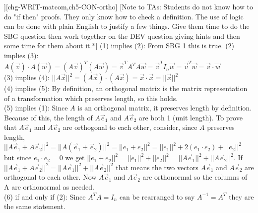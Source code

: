\begin{SaveQuestion}
{\begin{itemize}
\end{itemize}}
][chg-WRIT-matcom,ch5-CON-ortho] %
    [Note to TAs: Students do not know how to do "if then" proofs. They only know how to check a definition. The use of logic can be done with plain English to justify a few things. Give them time to do the SBG question then work together on the DEV question giving hints and then some time for them about it.*]    %
    (1) implies (2):
From SBG 1 this is true. 
(2) implies (3):
$A(\vec v) \cdot A(\vec w) = (A\vec v)^T(A\vec w) = \vec v ^T A^T A \vec w = \vec v ^T I_n \vec w = \vec v ^T \vec w = \vec v \cdot \vec w$ \\
(3) implies (4): $||A \vec x||^2 = (A\vec x) \cdot (A \vec x) = \vec x \cdot \vec x = ||\vec x||^2$ \\
(4) implies (5): By definition, an orthogonal matrix is the matrix representation of a transformation which preserves length, so this holds. \\
(5) implies (1): Since $A$ is an orthogonal matrix, it preserves length by definition. Because of this, the length of $A \vec e_1$ and $A \vec e_2$ are both 1 (unit length). To prove that $A \vec e_1$ and $A \vec e_2$ are orthogonal to each other, consider, since $A$ preserves length, 
$||A \vec e_1 + A\vec e_2||^2 = ||A(\vec e_1 + \vec e_2)||^2 = ||e_1 + e_2||^2 = ||e_1||^2 + 2(e_1 \cdot e_2) + ||e_2||^2$ but since $e_1 \cdot e_2 = 0$ we get $||e_1 + e_2||^2 = ||e_1||^2 + ||e_2||^2 = ||A \vec e_1||^2 + ||A \vec e_2||^2$. If $||A \vec e_1 + A \vec e_2||^2 = ||A \vec e_1||^2 + ||A \vec e_2||^2$ that means the two vectors $A \vec e_1$ and $A \vec e_2$ are orthogonal to each other. Now $A \vec e_1$ and $A \vec e_2$ are orthonormal so the columns of A are orthonormal as needed. \\
(6) if and only if (2): Since $A^TA=I_n$ can be rearranged to say $A^{-1}=A^T$ they are the same statement. 
\end{SaveQuestion}


